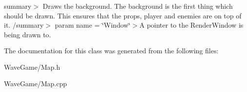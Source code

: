 summary$>$ Draws the background. The background is the first thing which should be drawn. This ensures that the props, player and enemies are on top of it. /summary$>$ param name = \char`\"{}\+Window\char`\"{}$>$A pointer to the Render\+Window is being drawn to.

The documentation for this class was generated from the following files\+:\begin{DoxyCompactItemize}
\item 
Wave\+Game/Map.\+h\item 
Wave\+Game/Map.\+cpp\end{DoxyCompactItemize}
